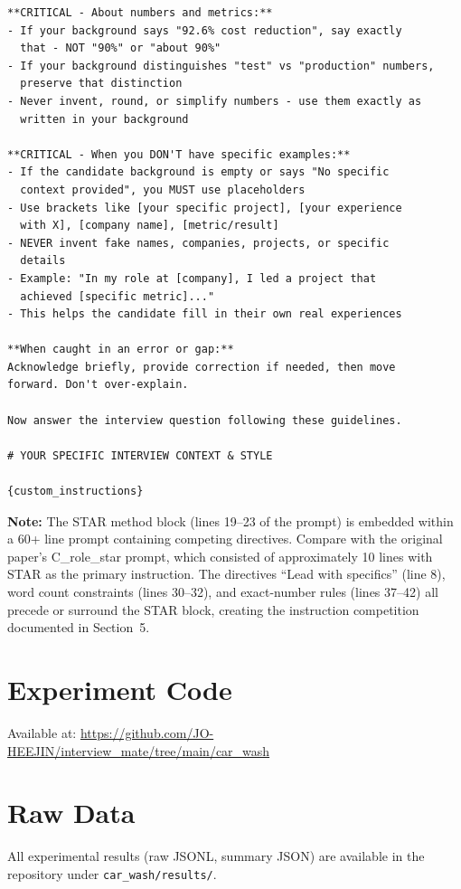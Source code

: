 \documentclass[11pt]{article}
\begin{document}
\begin{lstlisting}
**CRITICAL - About numbers and metrics:**
- If your background says "92.6% cost reduction", say exactly
  that - NOT "90%" or "about 90%"
- If your background distinguishes "test" vs "production" numbers,
  preserve that distinction
- Never invent, round, or simplify numbers - use them exactly as
  written in your background

**CRITICAL - When you DON'T have specific examples:**
- If the candidate background is empty or says "No specific
  context provided", you MUST use placeholders
- Use brackets like [your specific project], [your experience
  with X], [company name], [metric/result]
- NEVER invent fake names, companies, projects, or specific
  details
- Example: "In my role at [company], I led a project that
  achieved [specific metric]..."
- This helps the candidate fill in their own real experiences

**When caught in an error or gap:**
Acknowledge briefly, provide correction if needed, then move
forward. Don't over-explain.

Now answer the interview question following these guidelines.

# YOUR SPECIFIC INTERVIEW CONTEXT & STYLE

{custom_instructions}
\end{lstlisting}

\textbf{Note:} The STAR method block (lines 19--23 of the prompt) is embedded within a 60+ line prompt containing competing directives. Compare with the original paper's C\_role\_star prompt, which consisted of approximately 10 lines with STAR as the primary instruction. The directives ``Lead with specifics'' (line 8), word count constraints (lines 30--32), and exact-number rules (lines 37--42) all precede or surround the STAR block, creating the instruction competition documented in Section~5.

\section{Experiment Code}

Available at: \url{https://github.com/JO-HEEJIN/interview_mate/tree/main/car_wash}

\section{Raw Data}

\begin{sloppypar}
All experimental results (raw JSONL, summary JSON) are available in the repository under
\texttt{car\_wash/\allowbreak{}results/}.
\end{sloppypar}
\end{document}
